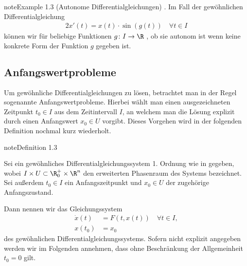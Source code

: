 \documentclass[letterpaper,10pt,english]{jupyterBook}
\begin{document}
\begin{sphinxadmonition}{note}{Example 1.3 (Autonome Differentialgleichungen)}
. Im Fall der gewöhnlichen Differentialgleichung
\begin{equation*}
\begin{split}2x'(t) = x(t)\cdot \sin(g(t)) \quad \forall t \in I\end{split}
\end{equation*}
\sphinxAtStartPar
können wir für beliebige Funktionen \(g \colon I \rightarrow \R\) , ob sie autonom ist wenn keine konkrete Form der Funktion \(g\) gegeben ist.
\end{sphinxadmonition}


\subsection{Anfangswertprobleme}
\label{\detokenize{ode/repetition:anfangswertprobleme}}
\sphinxAtStartPar
Um gewöhnliche Differentialgleichungen zu lösen, betrachtet man in der Regel sogenannte Anfangswertprobleme.
Hierbei wählt man einen ausgezeichneten Zeitpunkt \(t_0\in I\) aus dem Zeitintervall \(I\), an welchem man die Lösung explizit durch einen Anfangswert \(x_0\in U\) vorgibt.
Dieses Vorgehen wird in der folgenden Definition nochmal kurz wiederholt.
\label{ode/repetition:def:anfangswertproblem}
\begin{sphinxadmonition}{note}{Definition 1.3}



\sphinxAtStartPar
Sei ein gewöhnliches Differentialgleichungssystem 1. Ordnung wie in {\hyperref[\detokenize{ode/repetition:def:DGL}]{}} gegeben, wobei \(I \times U \subset \R_0^+ \times \R^n\) den erweiterten Phasenraum des Systems bezeichnet.
Sei außerdem \(t_0 \in I\) ein Anfangszeitpunkt und \(x_0 \in U\) der zugehörige Anfangszustand.

\sphinxAtStartPar
Dann nennen wir das Gleichungssystem
\begin{equation}\label{equation:ode/repetition:eq:AWP}
\begin{split}\dot{x}(t) &= F(t, x(t))\quad\forall t\in I, \\
x(t_0) &= x_0\end{split}
\end{equation}
\sphinxAtStartPar
{} des gewöhnlichen Differentialgleichungssystems.
Sofern nicht explizit angegeben werden wir im Folgenden annehmen, dass ohne Beschränkung der Allgemeinheit \(t_0=0\) gilt.
\end{sphinxadmonition}
\end{document}
